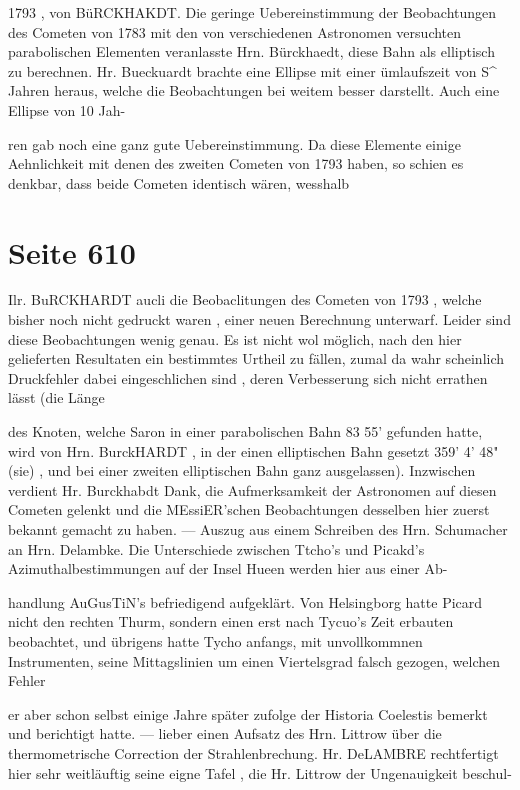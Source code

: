 \documentclass[10pt,a4paper]{article}
\begin{document}
1793 , von BüRCKHAKDT. Die geringe Uebereinstimmung der Beobachtungen des Cometen von 1783 mit den von verschiedenen Astronomen versuchten parabolischen Elementen veranlasste Hrn. Bürckhaedt, diese Bahn als elliptisch zu berechnen. Hr. Bueckuardt brachte eine Ellipse mit einer ümlaufszeit von S\textasciicircum{} Jahren heraus, welche die Beobachtungen bei weitem besser darstellt. Auch eine Ellipse von 10 Jah-

ren gab noch eine ganz gute Uebereinstimmung. Da diese Elemente einige Aehnlichkeit mit denen des zweiten Cometen von 1793 haben, so schien es denkbar, dass beide Cometen identisch wären, wesshalb


\newpage
\section*{Seite 610}
Ilr. BuRCKHARDT aucli die Beobaclitungen des Cometen von 1793 , welche bisher noch nicht gedruckt waren , einer neuen Berechnung unterwarf. Leider sind diese Beobachtungen wenig genau. Es ist nicht wol möglich, nach den hier gelieferten Resultaten ein bestimmtes Urtheil zu fällen, zumal da wahr scheinlich Druckfehler dabei eingeschlichen sind , deren Verbesserung sich nicht errathen lässt (die Länge

des Knoten, welche Saron in einer parabolischen Bahn 83\textdegree{} 55' gefunden hatte, wird von Hrn. BurckHARDT , in der einen elliptischen Bahn gesetzt 359' 4' 48" (sie) , und bei einer zweiten elliptischen Bahn ganz ausgelassen). Inzwischen verdient Hr. Burckhabdt Dank, die Aufmerksamkeit der Astronomen auf diesen Cometen gelenkt und die MEssiER'schen Beobachtungen desselben hier zuerst bekannt gemacht zu haben. — Auszug aus einem Schreiben des Hrn. Schumacher an Hrn. Delambke. Die Unterschiede zwischen Ttcho's und Picakd's Azimuthalbestimmungen auf der Insel Hueen werden hier aus einer Ab-

handlung AuGusTiN's befriedigend aufgeklärt. Von Helsingborg hatte Picard nicht den rechten Thurm, sondern einen erst nach Tycuo's Zeit erbauten beobachtet, und übrigens hatte Tycho anfangs, mit unvollkommnen Instrumenten, seine Mittagslinien um einen Viertelsgrad falsch gezogen, welchen Fehler

er aber schon selbst einige Jahre später zufolge der Historia Coelestis bemerkt und berichtigt hatte. — lieber einen Aufsatz des Hrn. Littrow über die thermometrische Correction der Strahlenbrechung. Hr. DeLAMBRE rechtfertigt hier sehr weitläuftig seine eigne Tafel , die Hr. Littrow der Ungenauigkeit beschul-
\end{document}
